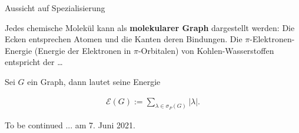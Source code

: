\documentclass[aspectratio=169]{beamer}
\begin{document}
\begin{frame}{Aussicht auf Spezialisierung}

    Jedes chemische Molekül kann als \textbf{molekularer Graph} dargestellt werden:
    Die Ecken entsprechen Atomen und die Kanten deren Bindungen.
    Die $\pi$-Elektronen-Energie (Energie der Elektronen in $\pi$-Orbitalen) von Kohlen-Wasserstoffen entspricht der \dots
    
    \begin{definition*}

        Sei $G$ ein Graph, dann lautet seine Energie

        \begin{align*}
            \mathcal E(G)
            :=
            \sum_{\lambda \in \sigma_P(G)} |\lambda|.
        \end{align*}

    \end{definition*}

\end{frame}

\begin{frame}{}
 
    
    \begin{block}{}

        {
            \centering
            \huge
            To be continued ... am 7. Juni 2021.
        }

    \end{block}

\end{frame}

\end{document}
